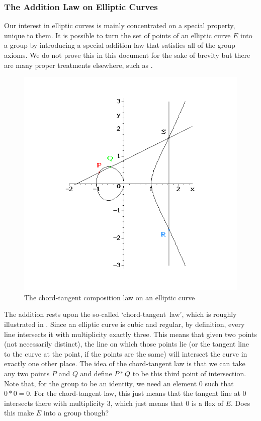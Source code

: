 \subsubsection{The Addition Law on Elliptic Curves}
Our interest in elliptic curves is mainly concentrated on a special property, unique to them.
It is possible to turn the set of points of an elliptic curve $E$ into a group by introducing a special addition law that satisfies all of the group axioms.
We do not prove this in this document for the sake of brevity but there are many proper treatments elsewhere, such as \cite{silverman2009}.
\begin{figure}[htbp]
	\centering
	\includegraphics[scale=0.5]{addition.png}
	\caption{The chord-tangent composition law on an elliptic curve}
	\label{chord-tangent}
\end{figure}
The addition rests upon the so-called `chord-tangent~law', which is roughly illustrated in .
Since an elliptic curve is cubic and regular, by definition, every line intersects it with multiplicity exactly three.
This means that given two points (not necessarily distinct), the line on which those points lie (or the tangent line to the curve at the point, if the points are the same) will intersect the curve in exactly one other place.
The idea of the chord-tangent law is that we can take any two points $P$ and $Q$ and define $P * Q$ to be this third point of intersection.
Note that, for the group to be an identity, we need an element $0$ such that $0 * 0 = 0$.
For the chord-tangent law, this just means that the tangent line at $0$ intersects there with multiplicity 3, which just means that $0$ is a flex of $E$.
Does this make $E$ into a group though?

